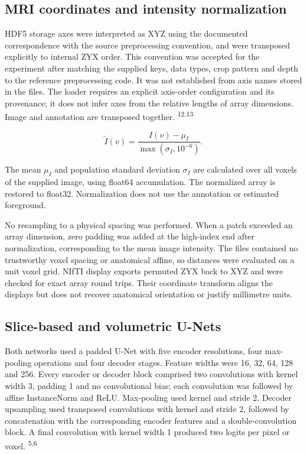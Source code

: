 \documentclass[11pt,a4paper]{article}
\begin{document}
\subsection*{MRI coordinates and intensity normalization}

HDF5 storage axes were interpreted as XYZ using the documented correspondence with the source preprocessing convention, and were transposed explicitly to internal ZYX order. This convention was accepted for the experiment after matching the supplied keys, data types, crop pattern and depth to the reference preprocessing code. It was not established from axis names stored in the files. The loader requires an explicit axis-order configuration and its provenance; it does not infer axes from the relative lengths of array dimensions. Image and annotation are transposed together. \textsuperscript{12,13}




\begin{equation}
\label{eq:mri-normalization}
\widetilde I(v)=\frac{I(v)-\mu_I}{\max(\sigma_I,10^{-6})}.
\end{equation}


The mean $\mu_I$ and population standard deviation $\sigma_I$ are calculated over all voxels of the supplied image, using float64 accumulation. The normalized array is restored to float32. Normalization does not use the annotation or estimated foreground.



No resampling to a physical spacing was performed. When a patch exceeded an array dimension, zero padding was added at the high-index end after normalization, corresponding to the mean image intensity. The files contained no trustworthy voxel spacing or anatomical affine, so distances were evaluated on a unit voxel grid. NIfTI display exports permuted ZYX back to XYZ and were checked for exact array round trips. Their coordinate transform aligns the displays but does not recover anatomical orientation or justify millimetre units.



\subsection*{Slice-based and volumetric U-Nets}

Both networks used a padded U-Net with five encoder resolutions, four max-pooling operations and four decoder stages. Feature widths were 16, 32, 64, 128 and 256. Every encoder or decoder block comprised two convolutions with kernel width 3, padding 1 and no convolutional bias; each convolution was followed by affine InstanceNorm and ReLU. Max-pooling used kernel and stride 2. Decoder upsampling used transposed convolutions with kernel and stride 2, followed by concatenation with the corresponding encoder features and a double-convolution block. A final convolution with kernel width 1 produced two logits per pixel or voxel. \textsuperscript{5,6}
\end{document}
